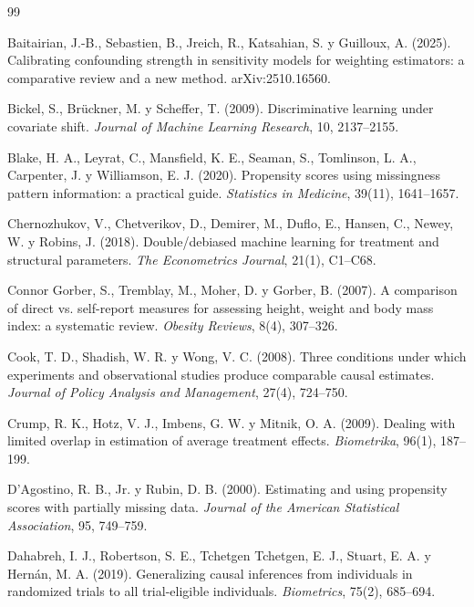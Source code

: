 \begin{thebibliography}{99}\small

 Baitairian, J.-B., Sebastien, B., Jreich, R., Katsahian, S. y Guilloux, A. (2025). Calibrating confounding strength in sensitivity models for weighting estimators: a comparative review and a new method. arXiv:2510.16560.

 Bickel, S., Brückner, M. y Scheffer, T. (2009). Discriminative learning under covariate shift. \emph{Journal of Machine Learning Research}, 10, 2137--2155.

 Blake, H. A., Leyrat, C., Mansfield, K. E., Seaman, S., Tomlinson, L. A., Carpenter, J. y Williamson, E. J. (2020). Propensity scores using missingness pattern information: a practical guide. \emph{Statistics in Medicine}, 39(11), 1641--1657.

 Chernozhukov, V., Chetverikov, D., Demirer, M., Duflo, E., Hansen, C., Newey, W. y Robins, J. (2018). Double/debiased machine learning for treatment and structural parameters. \emph{The Econometrics Journal}, 21(1), C1--C68.

 Connor Gorber, S., Tremblay, M., Moher, D. y Gorber, B. (2007). A comparison of direct vs. self-report measures for assessing height, weight and body mass index: a systematic review. \emph{Obesity Reviews}, 8(4), 307--326.

 Cook, T. D., Shadish, W. R. y Wong, V. C. (2008). Three conditions under which experiments and observational studies produce comparable causal estimates. \emph{Journal of Policy Analysis and Management}, 27(4), 724--750.

 Crump, R. K., Hotz, V. J., Imbens, G. W. y Mitnik, O. A. (2009). Dealing with limited overlap in estimation of average treatment effects. \emph{Biometrika}, 96(1), 187--199.

 D'Agostino, R. B., Jr. y Rubin, D. B. (2000). Estimating and using propensity scores with partially missing data. \emph{Journal of the American Statistical Association}, 95, 749--759.

 Dahabreh, I. J., Robertson, S. E., Tchetgen Tchetgen, E. J., Stuart, E. A. y Hernán, M. A. (2019). Generalizing causal inferences from individuals in randomized trials to all trial-eligible individuals. \emph{Biometrics}, 75(2), 685--694.


\end{thebibliography}
